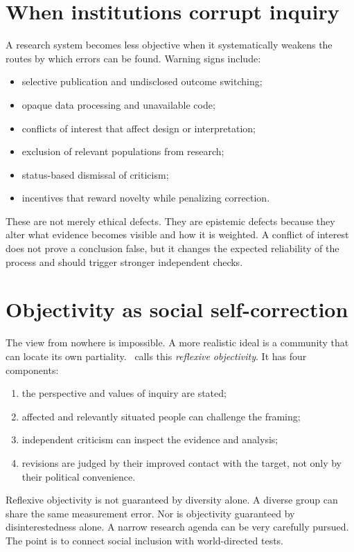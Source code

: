 \section{When institutions corrupt inquiry}

A research system becomes less objective when it systematically weakens the
routes by which errors can be found. Warning signs include:

\begin{itemize}
\item selective publication and undisclosed outcome switching;
\item opaque data processing and unavailable code;
\item conflicts of interest that affect design or interpretation;
\item exclusion of relevant populations from research;
\item status-based dismissal of criticism;
\item incentives that reward novelty while penalizing correction.
\end{itemize}

These are not merely ethical defects. They are epistemic defects because they
alter what evidence becomes visible and how it is weighted. A conflict of
interest does not prove a conclusion false, but it changes the expected
reliability of the process and should trigger stronger independent checks.

\section{Objectivity as social self-correction}

The view from nowhere is impossible. A more realistic ideal is a community that
can locate its own partiality. \RCR\ calls this \emph{reflexive objectivity}.
It has four components:

\begin{enumerate}
\item the perspective and values of inquiry are stated;
\item affected and relevantly situated people can challenge the framing;
\item independent criticism can inspect the evidence and analysis;
\item revisions are judged by their improved contact with the target, not only
by their political convenience.
\end{enumerate}

Reflexive objectivity is not guaranteed by diversity alone. A diverse group can
share the same measurement error. Nor is objectivity guaranteed by
disinterestedness alone. A narrow research agenda can be very carefully
pursued. The point is to connect social inclusion with world-directed tests.

